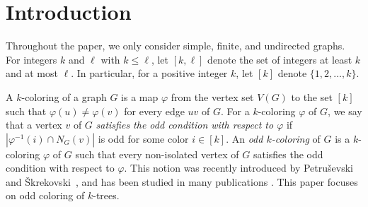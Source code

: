 
\theoremstyle{definition}
\newtheorem{theorem}{Theorem}[]
\newtheorem{corollary}[theorem]{Corollary}
\newtheorem{conjecture}[theorem]{Conjecture}

\section{Introduction}\label{section:intro}

Throughout the paper, we only consider simple, finite, and undirected graphs.
For integers $k$ and $\ell$ with $k\leq \ell$, let $[k,\ell]$ denote the set of integers at least $k$ and at most $\ell$.
In particular, for a positive integer $k$, let $[k]$ denote $\{1,2,\dots , k\}$.

A $k$-coloring of a graph $G$ is a map $\varphi$ from the vertex set $V(G)$ to the set $[k]$ such that $\varphi(u)\neq \varphi(v)$ for every edge $uv$ of $G$.
For a $k$-coloring $\varphi$ of $G$, we say that a vertex $v$ of $G$ \emph{satisfies the odd condition with respect to $\varphi$} if $|\varphi^{-1}(i)\cap N_G(v)|$ is odd for some color $i\in [k]$.
An \emph{odd $k$-coloring} of $G$ is a $k$-coloring $\varphi$ of $G$ such that every non-isolated vertex of $G$ satisfies the odd condition with respect to $\varphi$.
This notion was recently introduced by Petru\v{s}evski and \v{S}krekovski~\cite{PS2022}, and has been studied in many publications \cite{CPS2022, CCKP2023, C2024, CLS2023, DOP2024, KMOOT2024+, KZ2024, MSTY2024, PP2023, PS2022, TY2023, WY2024}.
This paper focuses on odd coloring of $k$-trees.

